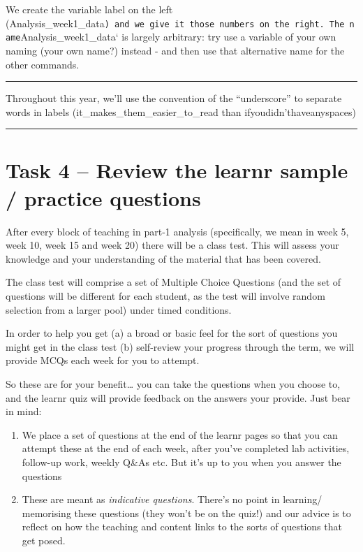 \documentclass[
]{book}
\begin{document}
We create the variable label on the left (Analysis\_week1\_data\texttt{)\ and\ we\ give\ it\ those\ numbers\ on\ the\ right.\ The\ name}Analysis\_week1\_data` is largely arbitrary: try use a variable of your own naming (your own name?) instead - and then use that alternative name for the other commands.

\begin{center}\rule{0.5\linewidth}{0.5pt}\end{center}

Throughout this year, we'll use the convention of the ``underscore'' to separate words in labels (it\_makes\_them\_easier\_to\_read than ifyoudidn'thaveanyspaces)

\begin{center}\rule{0.5\linewidth}{0.5pt}\end{center}

\hypertarget{task-4-review-the-learnr-sample-practice-questions}{%
\section{Task 4 -- Review the learnr sample / practice questions}\label{task-4-review-the-learnr-sample-practice-questions}}

After every block of teaching in part-1 analysis (specifically, we mean in week 5, week 10, week 15 and week 20) there will be a class test. This will assess your knowledge and your understanding of the material that has been covered.

The class test will comprise a set of Multiple Choice Questions (and the set of questions will be different for each student, as the test will involve random selection from a larger pool) under timed conditions.

In order to help you get (a) a broad or basic feel for the sort of questions you might get in the class test (b) self-review your progress through the term, we will provide MCQs each week for you to attempt.

So these are for your benefit\ldots{} you can take the questions when you choose to, and the learnr quiz will provide feedback on the answers your provide. Just bear in mind:

\begin{enumerate}
\def\labelenumi{\alph{enumi})}
\item
  We place a set of questions at the end of the learnr pages so that you can attempt these at the end of each week, after you've completed lab activities, follow-up work, weekly Q\&As etc. But it's up to you when you answer the questions
\item
  These are meant as \emph{indicative questions}. There's no point in learning/ memorising these questions (they won't be on the quiz!) and our advice is to reflect on how the teaching and content links to the sorts of questions that get posed.
\end{enumerate}
\end{document}

